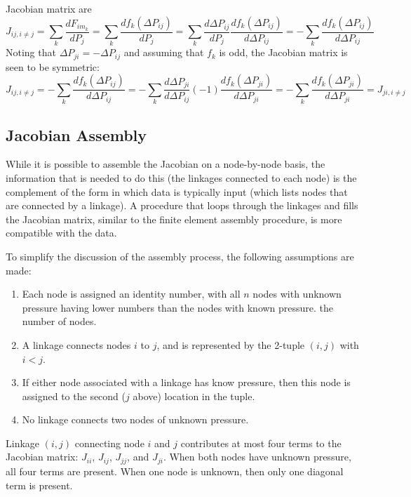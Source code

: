 \documentclass[10pt]{report}
\begin{document}
Jacobian matrix are
\begin{equation}
J_{ij,i\ne j} = \sum_k \frac{dF_{im_k}}{dP_j}
              = \sum_k \frac{df_k\left(\Delta P_{ij}\right)}{dP_j}
              = \sum_k \frac{d\Delta P_{ij}}{dP_j}
                       \frac{df_k\left(\Delta P_{ij}\right)}{d\Delta P_{ij}}
              = -\sum_k \frac{df_k\left(\Delta P_{ij}\right)}{d\Delta P_{ij}}
\end{equation}
Noting that $\Delta P_{ji} = -\Delta P_{ij}$ and assuming that $f_k$ is
odd, the Jacobian matrix is seen to be symmetric:
\begin{equation}
J_{ij,i\ne j} = -\sum_k \frac{df_k\left(\Delta P_{ij}\right)}{d\Delta P_{ij}}
              = -\sum_k \frac{d\Delta P_{ji}}{d\Delta P_{ij}}
                       (-1)\frac{df_k\left(\Delta P_{ji}\right)}{d\Delta P_{ji}}
              = -\sum_k \frac{df_k\left(\Delta P_{ji}\right)}{d\Delta P_{ji}}
              = J_{ji,i\ne j}
\end{equation}
\subsection{Jacobian Assembly}
While it is possible to assemble the Jacobian on a node-by-node basis, the
information that is needed to do this (the linkages connected to each node) is
the complement of the form in which data is typically input (which lists nodes
that are connected by a linkage). A procedure that loops through the linkages
and fills the Jacobian matrix, similar to the finite element assembly 
procedure, is more compatible with the data. 

To simplify the discussion of the assembly process, the following assumptions
are made:
\begin{enumerate}
\item Each node is assigned an identity number, with all $n$ nodes with unknown 
pressure having lower numbers than the nodes with known pressure. 
the number of nodes.
\item A linkage connects nodes $i$ to $j$, and is represented by the 2-tuple
$(i,j)$ with $i < j$.
\item If either node associated with a linkage has know pressure, then this
node is assigned to the second ($j$ above) location in the tuple.
\item No linkage connects two nodes of unknown pressure.
\end{enumerate}

Linkage $(i,j)$ connecting node $i$ and $j$ contributes at most four terms
to the Jacobian matrix: $J_{ii}$, $J_{ij}$, $J_{jj}$, and $J_{ji}$. When both
nodes have unknown pressure, all four terms are present. When one node is 
unknown, then only one diagonal term is present.
\end{document}
